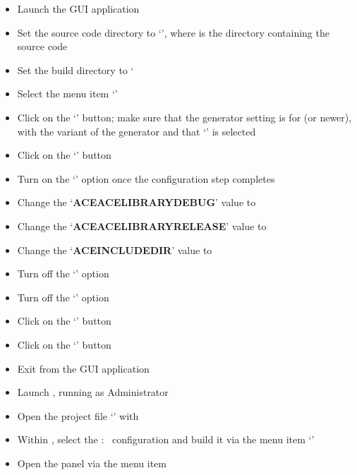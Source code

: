 \begin{itemize}
\item Launch the  GUI application
\item\exSp{}Set the source code directory to `',
where  is the directory containing the \mplusm{} source code
\item\exSp{}Set the build directory to `
\item\exSp{}Select the menu item `'
\item\exSp{}Click on the `' button; make sure that the generator
setting is for  (or newer), with the  variant of
the generator and that `' is selected
\item\exSp{}Click on the `' button
\item\exSp{}Turn on the `' option once the configuration step completes
\item\exSp{}Change the `\textbf{ACE\fUS{}ACE\fUS{}LIBRARY\fUS{}DEBUG}' value to
\item\exSp{}Change the `\textbf{ACE\fUS{}ACE\fUS{}LIBRARY\fUS{}RELEASE}' value to
\item\exSp{}Change the `\textbf{ACE\fUS{}INCLUDE\fUS{}DIR}' value to
\item\exSp{}Turn off the `' option
\item\exSp{}Turn off the `' option
\item\exSp{}Click on the `' button
\item\exSp{}Click on the `' button
\item\exSp{}Exit from the  GUI application
\item\exSp{}Launch , running as Administrator
\item\exSp{}Open the project file
`' with
\item\exSp{}Within , select the  :\ 
configuration and build it via the menu item
`'
\item\exSp{}Open the  panel via the menu item

\end{itemize}
